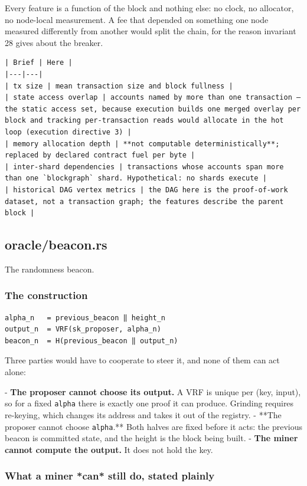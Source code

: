 \documentclass[11pt,a4paper]{article}
\begin{document}
Every feature is a function of the block and nothing else: no clock, no
allocator, no node-local measurement. A fee that depended on something one
node measured differently from another would split the chain, for the reason
invariant 28 gives about the breaker.

\begin{verbatim}
| Brief | Here |
|---|---|
| tx size | mean transaction size and block fullness |
| state access overlap | accounts named by more than one transaction — the static access set, because execution builds one merged overlay per block and tracking per-transaction reads would allocate in the hot loop (execution directive 3) |
| memory allocation depth | **not computable deterministically**; replaced by declared contract fuel per byte |
| inter-shard dependencies | transactions whose accounts span more than one `blockgraph` shard. Hypothetical: no shards execute |
| historical DAG vertex metrics | the DAG here is the proof-of-work dataset, not a transaction graph; the features describe the parent block |
\end{verbatim}

\subsection{oracle/beacon.rs}
The randomness beacon.

\subsubsection{The construction}

\begin{verbatim}
alpha_n   = previous_beacon ‖ height_n
output_n  = VRF(sk_proposer, alpha_n)
beacon_n  = H(previous_beacon ‖ output_n)
\end{verbatim}

Three parties would have to cooperate to steer it, and none of them can act
alone:

- \textbf{The proposer cannot choose its output.} A VRF is unique per
  (key, input), so for a fixed \texttt{alpha} there is exactly one proof it can
  produce. Grinding requires re-keying, which changes its address and takes
  it out of the registry.
- **The proposer cannot choose \texttt{alpha}.** Both halves are fixed before it
  acts: the previous beacon is committed state, and the height is the block
  being built.
- \textbf{The miner cannot compute the output.} It does not hold the key.

\subsubsection{What a miner *can* still do, stated plainly}
\end{document}

